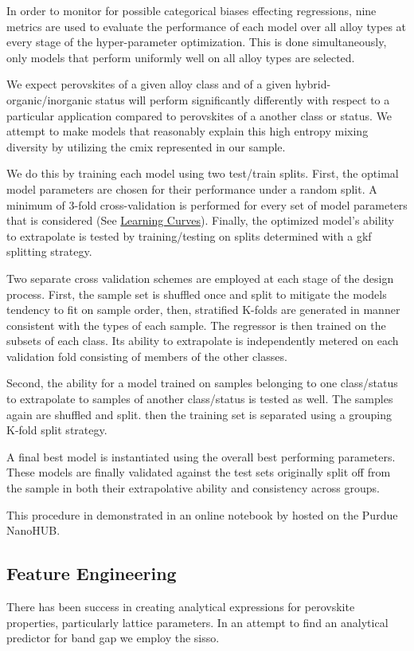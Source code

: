 \documentclass[aip, jmp, amsmath, amssymb, nofootinbib]{revtex4-2}
\begin{document}
In order to monitor for possible categorical biases effecting
regressions, nine metrics are used to evaluate the performance of each
model over all alloy types at every stage of the hyper-parameter
optimization. This is done simultaneously, only models that perform
uniformly well on all alloy types are selected.

We expect perovskites of a given alloy class and of a given
hybrid-organic/inorganic status will perform significantly differently
with respect to a particular application compared to perovskites of a
another class or status. We attempt to make models that reasonably
explain this high entropy mixing diversity by utilizing the \gls{cmix} represented in our sample.

We do this by training each model using two test/train splits. First,
the optimal model parameters are chosen for their performance under a
random split. A minimum of 3-fold cross-validation is performed for
every set of model parameters that is considered (See \hyperref[sec:org0db91ac]{Learning Curves}). Finally, the optimized model's ability to extrapolate is
tested by training/testing on splits determined with a \gls{gkf} splitting strategy.

Two separate cross validation schemes are employed at each stage of
the design process. First, the sample set is shuffled once and split
to mitigate the models tendency to fit on sample order, then,
stratified K-folds are generated in manner consistent with the types
of each sample. The regressor is then trained on the subsets of each
class. Its ability to extrapolate is independently metered on each
validation fold consisting of members of the other classes.

Second, the ability for a model trained on samples belonging to one
class/status to extrapolate to samples of another class/status is
tested as well. The samples again are shuffled and split. then the
training set is separated using a grouping K-fold split strategy.

A final best model is instantiated using the overall best performing
parameters. These models are finally validated against the test sets
originally split off from the sample in both their extrapolative
ability and consistency across groups.

This procedure in demonstrated in an online notebook by
\citet{manganaris-2022-mrs-comput} hosted on the Purdue NanoHUB.

\subsection*{Feature Engineering}
\label{sec:org5c607b7}
There has been success in creating analytical expressions for
perovskite properties, particularly lattice
parameters\cite{jiang-2006-predic-lattic}. In an attempt to find an
analytical predictor for band gap we employ the \Acrfull{sisso}\cite{ouyang-2018-sisso}.
\end{document}
